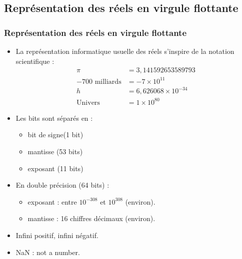 \documentclass[xcolor=svgnames]{beamer}
\begin{document}
\subsection{Représentation des réels en virgule flottante}
\begin{frame}
    \frametitle{Représentation des réels en virgule flottante}
\pause
    \begin{itemize}
    \item La représentation informatique usuelle des réels s'inspire de la
      notation scientifique :
      \begin{align*}
        \pi &= 3,141592653589793\tag{pi}\\
        -700 \text{ milliards} &= -7 \times 10^{11}\tag{Paulson}\\
        h &= 6,626068 \times 10^{-34} \tag{Planck}\\
        \text{Univers} &= 1 \times 10^{80}  \tag{Atomes}
      \end{align*}\pause
\vspace{-.8cm}
\item Les bits sont séparés en :
  \begin{itemize}
  \item bit de signe\hfill (1 bit)
  \item mantisse \hfill (53 bits)
  \item exposant \hfill (11 bits)
  \end{itemize}\pause
\item En double précision (64 bits) :
  \begin{itemize}
\item exposant : entre $10^{-308}$ et $10^{308}$ (environ).
\item mantisse : 16 chiffres décimaux (environ).
  \end{itemize}\pause
\item Infini positif, infini négatif.
\item NaN : not a number.
    \end{itemize}
\end{frame}
\end{document}
